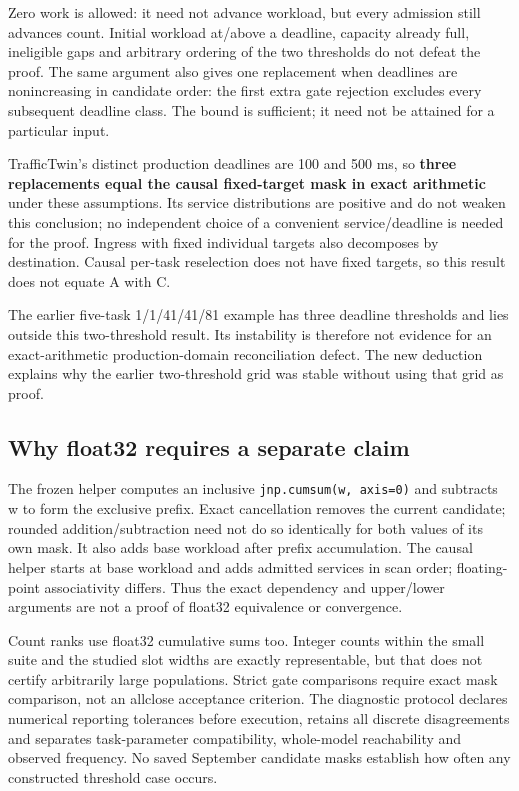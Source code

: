 \documentclass[11pt,a4paper]{article}
\begin{document}
Zero work is allowed: it need not advance workload, but every admission still advances count. Initial workload at/above a deadline, capacity already full, ineligible gaps and arbitrary ordering of the two thresholds do not defeat the proof. The same argument also gives one replacement when deadlines are nonincreasing in candidate order: the first extra gate rejection excludes every subsequent deadline class. The bound is sufficient; it need not be attained for a particular input.

TrafficTwin's distinct production deadlines are 100 and 500 ms, so \textbf{three replacements equal the causal fixed-target mask in exact arithmetic} under these assumptions. Its service distributions are positive and do not weaken this conclusion; no independent choice of a convenient service/deadline is needed for the proof. Ingress with fixed individual targets also decomposes by destination. Causal per-task reselection does not have fixed targets, so this result does not equate A with C.

The earlier five-task 1/1/41/41/81 example has three deadline thresholds and lies outside this two-threshold result. Its instability is therefore not evidence for an exact-arithmetic production-domain reconciliation defect. The new deduction explains why the earlier two-threshold grid was stable without using that grid as proof.

\subsection{Why float32 requires a separate claim}\label{sec:C.4}

The frozen helper computes an inclusive \texttt{jnp.cumsum(w, axis=0)} and subtracts w to form the exclusive prefix. Exact cancellation removes the current candidate; rounded addition/subtraction need not do so identically for both values of its own mask. It also adds base workload after prefix accumulation. The causal helper starts at base workload and adds admitted services in scan order; floating-point associativity differs. Thus the exact dependency and upper/lower arguments are not a proof of float32 equivalence or convergence.

Count ranks use float32 cumulative sums too. Integer counts within the small suite and the studied slot widths are exactly representable, but that does not certify arbitrarily large populations. Strict gate comparisons require exact mask comparison, not an allclose acceptance criterion. The diagnostic protocol declares numerical reporting tolerances before execution, retains all discrete disagreements and separates task-parameter compatibility, whole-model reachability and observed frequency. No saved September candidate masks establish how often any constructed threshold case occurs.
\end{document}
